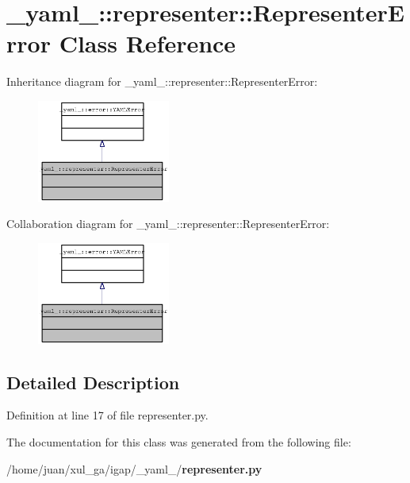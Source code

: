 \section{\_\-yaml\_\-::representer::RepresenterError Class Reference}
\label{class__yaml___1_1representer_1_1RepresenterError}
Inheritance diagram for \_\-yaml\_\-::representer::RepresenterError:\nopagebreak
\begin{figure}[H]
\begin{center}
\leavevmode
\includegraphics[width=124pt]{class__yaml___1_1representer_1_1RepresenterError__inherit__graph}
\end{center}
\end{figure}
Collaboration diagram for \_\-yaml\_\-::representer::RepresenterError:\nopagebreak
\begin{figure}[H]
\begin{center}
\leavevmode
\includegraphics[width=124pt]{class__yaml___1_1representer_1_1RepresenterError__coll__graph}
\end{center}
\end{figure}


\subsection{Detailed Description}


Definition at line 17 of file representer.py.

The documentation for this class was generated from the following file:\begin{CompactItemize}
\item 
/home/juan/xul\_\-ga/igap/\_\-yaml\_\-/{\bf representer.py}\end{CompactItemize}
